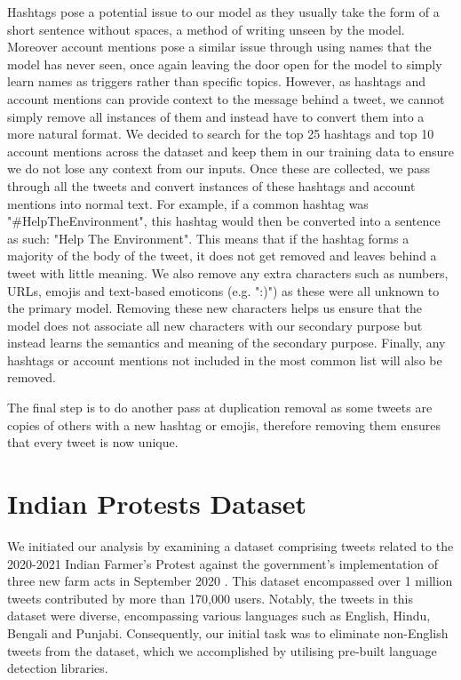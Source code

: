 Hashtags pose a potential issue to our model as they usually take the form of a short sentence without spaces, a method of writing unseen by the model. Moreover account mentions pose a similar issue through using names that the model has never seen, once again leaving the door open for the model to simply learn names as triggers rather than specific topics. However, as hashtags and account mentions can provide context to the message behind a tweet, we cannot simply remove all instances of them and instead have to convert them into a more natural format. We decided to search for the top 25 hashtags and top 10 account mentions across the dataset and keep them in our training data to ensure we do not lose any context from our inputs. Once these are collected, we pass through all the tweets and convert instances of these hashtags and account mentions into normal text. For example, if a common hashtag was "\#HelpTheEnvironment", this hashtag would then be converted into a sentence as such: "Help The Environment". This means that if the hashtag forms a majority of the body of the tweet, it does not get removed and leaves behind a tweet with little meaning. We also remove any extra characters such as numbers, URLs, emojis and text-based emoticons (e.g. ":)") as these were all unknown to the primary model. Removing these new characters helps us ensure that the model does not associate all new characters with our secondary purpose but instead learns the semantics and meaning of the secondary purpose. Finally, any hashtags or account mentions not included in the most common list will also be removed.

The final step is to do another pass at duplication removal as some tweets are copies of others with a new hashtag or emojis, therefore removing them ensures that every tweet is now unique.

\section{Indian Protests Dataset}
We initiated our analysis by examining a dataset comprising tweets related to the 2020-2021 Indian Farmer's Protest against the government's implementation of three new farm acts in September 2020 \cite{indian-protest-dataset}. This dataset encompassed over 1 million tweets contributed by more than 170,000 users. Notably, the tweets in this dataset were diverse, encompassing various languages such as English, Hindu, Bengali and Punjabi. Consequently, our initial task was to eliminate non-English tweets from the dataset, which we accomplished by utilising pre-built language detection libraries.

